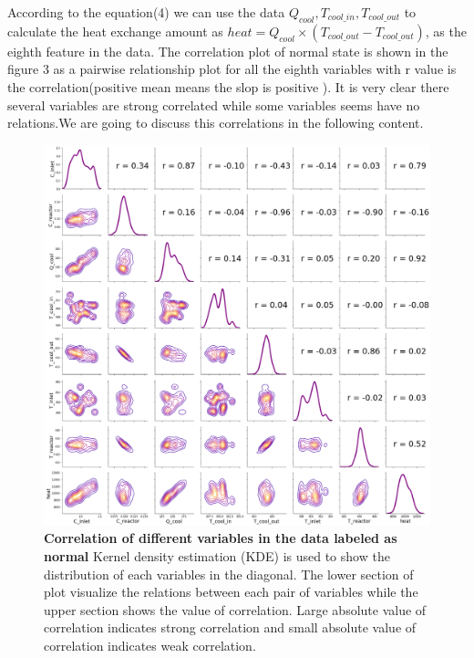 \documentclass[fleqn,11pt]{wlscirep}
\begin{document}
According to the equation(4) we can use the data $ Q_{cool}, T_{cool\_in},T_{cool\_out}$ to calculate the heat exchange amount as $heat =Q_{cool}\times( T_{cool\_out}-T_{cool\_out})$, as the eighth feature in the  data. The correlation plot of normal state is shown in the figure 3 as a  pairwise relationship plot for all the eighth variables with r value is the correlation(positive mean means the slop is positive ). It is very clear there several variables are strong correlated while some  variables seems have no relations.We are going to discuss this correlations in the following content.
\begin{figure}[h]
    \centering
    \includegraphics[width=13cm]{figure3.png}
    \caption{
    \textbf{Correlation of different variables in the data labeled as normal  } Kernel density estimation (KDE) is used to show the distribution of each variables in the diagonal. The lower section of plot visualize the  relations between each pair of variables while the upper section shows the  value of correlation. Large absolute value of  correlation indicates strong correlation and   small absolute value of  correlation indicates weak correlation.}
    \label{fig:1}
\end{figure}
\end{document}
